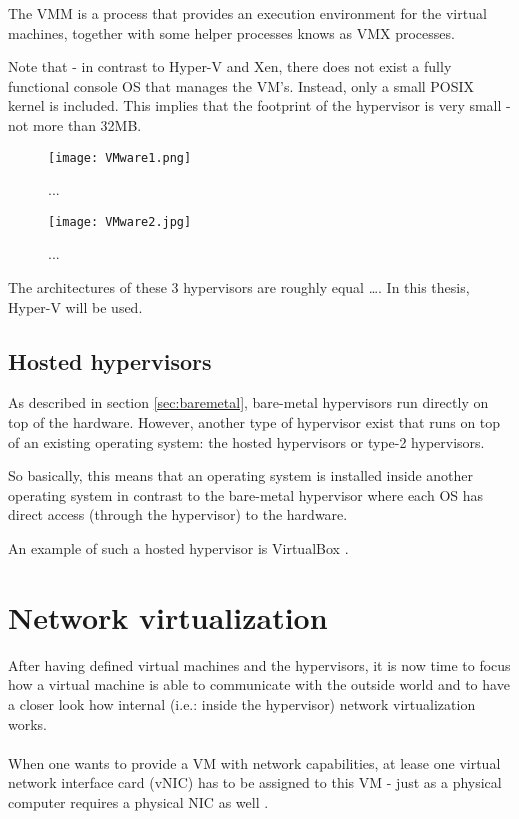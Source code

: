 The VMM is a process that provides an execution environment for the virtual machines, together with some helper processes knows as VMX processes.

Note that - in contrast to Hyper-V and Xen, there does not exist a fully functional console OS that manages the VM's. Instead, only a small POSIX kernel is included. This implies that the footprint of the hypervisor is very small - not more than 32MB.

\begin{figure}[h]
    \centering
    \texttt{[image: VMware1.png]}
    \caption[VMware architecture]{...}
\end{figure}
 \clearpage
\begin{figure}[h]
    \centering
    \texttt{[image: VMware2.jpg]}
    \caption[VMware simplified architecture]{...}
\end{figure}


The architectures of these 3 hypervisors are roughly equal \ldots .
In this thesis, Hyper-V will be used.
\subsection{Hosted hypervisors}

As described in section \ref{sec:baremetal}, bare-metal hypervisors run directly on top of the hardware. However, another type of hypervisor exist that runs on top of an existing operating system: the hosted hypervisors or type-2 hypervisors.

So basically, this means that an operating system is installed inside another operating system in contrast to the bare-metal hypervisor where each OS has direct access (through the hypervisor) to the hardware.

An example of such a hosted hypervisor is VirtualBox \citep{VirtualBox}.

\section{Network virtualization}

After having defined virtual machines and the hypervisors, it is now time to focus how a virtual machine is able to communicate with the outside world and to have a closer look how internal (i.e.: inside the hypervisor) network virtualization works. \\ \\
When one wants to provide a VM with network capabilities, at lease one virtual network interface card (vNIC) has to be assigned to this VM - just as a physical computer requires a physical NIC as well  \citep{Technet1}.

